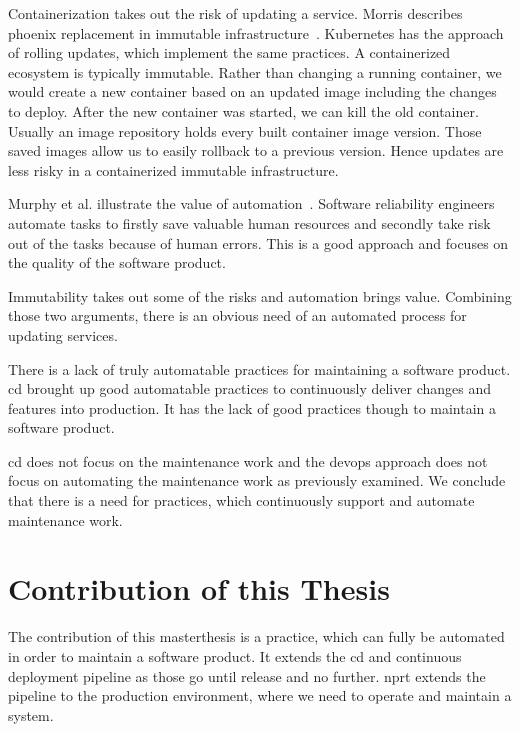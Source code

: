Containerization takes out the risk of updating a service. Morris describes phoenix
replacement in immutable infrastructure~\cite{infra_as_code_phoenix}. Kubernetes has the
approach of rolling updates, which implement the same practices. A containerized ecosystem
is typically immutable. Rather than changing a running container, we would create a new
container based on an updated image including the changes to deploy. After the new
container was started, we can kill the old container. Usually an image repository holds
every built container image version. Those saved images allow us to easily rollback to a
previous version. Hence updates are less risky in a containerized immutable
infrastructure.

Murphy et al. illustrate the value of automation~\cite{sre_automation}. Software
reliability engineers automate tasks to firstly save valuable human resources and
secondly take risk out of the tasks because of human errors. This is a good approach and
focuses on the quality of the software product.

Immutability takes out some of the risks and automation brings value. Combining those two
arguments, there is an obvious need of an automated process for updating services.

There is a lack of truly automatable practices for maintaining a software
product. \gls{cd} brought up good automatable practices to continuously deliver changes
and features into production. It has the lack of good practices though to maintain a
software product.

\gls{cd} does not focus on the maintenance work and the devops approach does not focus on
automating the maintenance work as previously examined. We conclude that there is a need
for practices, which continuously support and automate maintenance work.

\section{Contribution of this Thesis}

The contribution of this masterthesis is a practice, which can fully be automated in order
to maintain a software product. It extends the \gls{cd} and continuous deployment pipeline
as those go until release and no further. \gls{nprt} extends the pipeline to the
production environment, where we need to operate and maintain a system.

